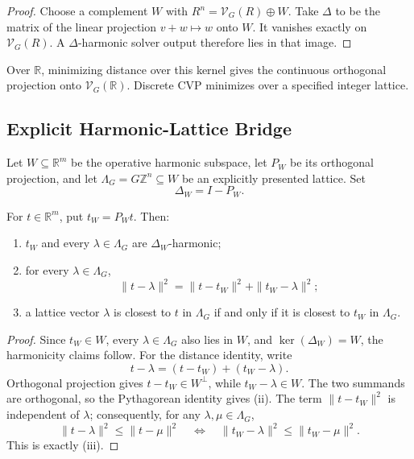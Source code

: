\begin{proof}
  Choose a complement \(W\) with \(R^n=\mathcal V_G(R)\oplus W\).
  Take \(\Delta\) to be the matrix of the linear projection
  \(v+w\mapsto w\) onto \(W\). It vanishes exactly on \(\mathcal V_G(R)\).
  A \(\Delta\)-harmonic solver output therefore lies in that image.
\end{proof}

Over \(\mathbb R\), minimizing distance over this kernel gives the
continuous orthogonal projection onto \(\mathcal V_G(\mathbb R)\).
Discrete CVP minimizes over a specified integer lattice.

\subsection{Explicit Harmonic-Lattice Bridge}

Let \(W\subseteq\mathbb R^m\) be the
operative harmonic subspace, let \(P_W\) be its orthogonal projection, and let
\(\Lambda_G=G\mathbb Z^n\subseteq W\) be an explicitly presented lattice. Set
\[
  \Delta_W=I-P_W.
\]

\begin{proposition}\label{prop:hodge-projection-is-cvp}
  For \(t\in\mathbb R^m\), put \(t_W=P_Wt\). Then:
  \begin{enumerate}[label=(\roman*)]
    \item \(t_W\) and every \(\lambda\in\Lambda_G\) are
      \(\Delta_W\)-harmonic;
    \item for every \(\lambda\in\Lambda_G\),
      \[
        \|t-\lambda\|^2
        =
        \|t-t_W\|^2+\|t_W-\lambda\|^2;
      \]
    \item a lattice vector \(\lambda\) is closest to \(t\) in
      \(\Lambda_G\) if and only if it is closest to \(t_W\) in
      \(\Lambda_G\).
  \end{enumerate}
\end{proposition}

\begin{proof}
  Since \(t_W\in W\), every \(\lambda\in\Lambda_G\) also lies in \(W\), and
  \(\ker(\Delta_W)=W\), the harmonicity claims follow. For the distance
  identity, write
  \[
    t-\lambda=(t-t_W)+(t_W-\lambda).
  \]
  Orthogonal projection gives \(t-t_W\in W^\perp\), while
  \(t_W-\lambda\in W\). The two summands are orthogonal, so the Pythagorean
  identity gives (ii). The term \(\|t-t_W\|^2\) is independent of
  \(\lambda\); consequently, for any \(\lambda,\mu\in\Lambda_G\),
  \[
    \|t-\lambda\|^2\le \|t-\mu\|^2
    \quad\Longleftrightarrow\quad
    \|t_W-\lambda\|^2\le \|t_W-\mu\|^2.
  \]
  This is exactly (iii).
\end{proof}


